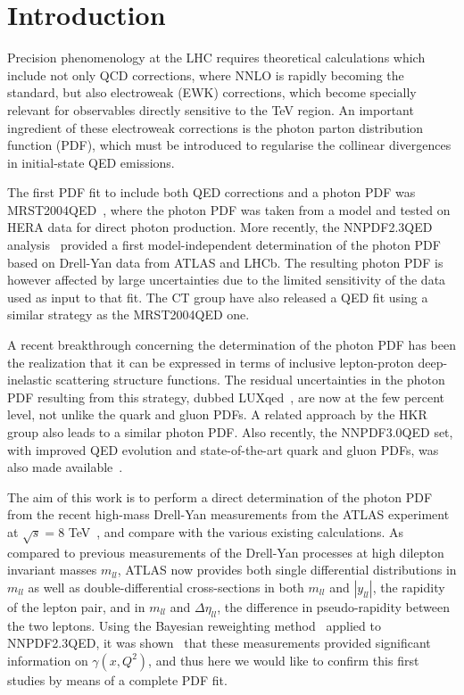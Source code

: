 \section{Introduction}

Precision phenomenology at the LHC requires theoretical calculations which
include not only QCD corrections, where NNLO is rapidly becoming
the standard, but also electroweak (EWK) corrections, which become
specially relevant for observables directly sensitive to the TeV region.
%
An important ingredient of these electroweak corrections is
the photon parton distribution function (PDF), which must
be introduced
to regularise the collinear divergences in initial-state QED emissions.

The first PDF fit to include both QED corrections and a photon PDF
was MRST2004QED~\cite{Martin:2004dh},
where the photon PDF was taken from a model
and tested on HERA data for direct photon production.
%
More recently, the NNPDF2.3QED analysis~\cite{Ball:2013hta}
provided a first model-independent
determination of the photon PDF based on Drell-Yan data
from ATLAS and LHCb.
%
The resulting photon PDF is however affected by large uncertainties
due to the limited sensitivity of the data used as input to that
fit.
%
The CT group have also released a QED fit using a similar strategy
as the MRST2004QED one.

A recent breakthrough concerning the determination of the
photon PDF has been the realization that it can be expressed
in terms of inclusive lepton-proton deep-inelastic scattering
structure functions.
%
The residual uncertainties in the photon PDF resulting from
this strategy, dubbed LUXqed~\cite{Manohar:2016nzj}, are now at the few percent level,
not unlike the quark and gluon PDFs.
%
A related approach by the HKR~\cite{Harland-Lang:2016apc}
group also leads to a similar photon PDF.
%
Also recently, the NNPDF3.0QED set, with improved
QED evolution and state-of-the-art quark and gluon
PDFs, was also made available~\cite{Bertone:2016ume,Ball:2014uwa}.

The aim of this work is to perform a direct determination
of the photon PDF from the recent high-mass Drell-Yan measurements
from the ATLAS experiment at $\sqrt{s}=8$ TeV~\cite{Aad:2016zzw},
and compare
with the various existing calculations.
%
As compared to previous measurements of the Drell-Yan processes
at high dilepton invariant masses $m_{ll}$, ATLAS now provides
both single differential distributions in $m_{ll}$ as well
as double-differential cross-sections in both $m_{ll}$
and $|y_{ll}|$, the rapidity of the lepton pair,
and in  $m_{ll}$ and $\Delta\eta_{ll}$, the difference in pseudo-rapidity
between the two leptons.
%
Using the Bayesian reweighting method~\cite{Ball:2011gg,Ball:2010gb}
applied to NNPDF2.3QED, it was shown~\cite{Aad:2016zzw}
that these measurements provided significant
information on $\gamma(x,Q^2)$, and thus here we would
like to confirm this first studies by means of a complete PDF fit.

